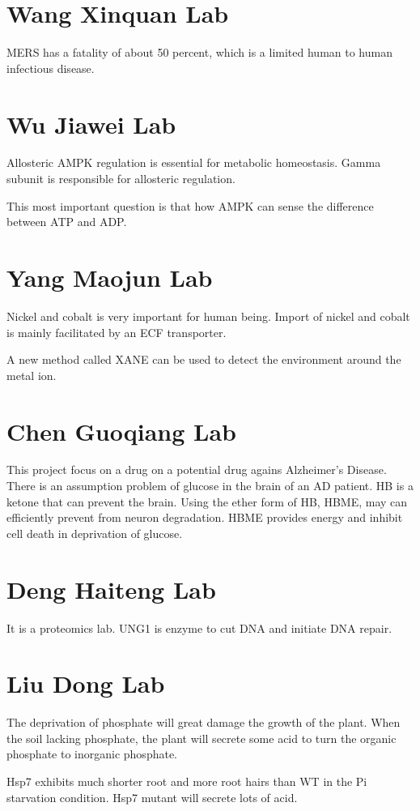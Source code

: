 \documentclass[11pt, oneside]{article}   	%
\begin{document}
\section{Wang Xinquan Lab}
	\par
	MERS has a fatality of about 50 percent, which is a limited human to human infectious disease.
	\par
\section{Wu Jiawei Lab}
	\par
	Allosteric AMPK regulation is essential for metabolic homeostasis. Gamma subunit is responsible for allosteric regulation. 
	\par
	This most important question is that how AMPK can sense the difference between ATP and ADP. 
	\par
\section{Yang Maojun Lab}
	\par
	Nickel and cobalt is very important for human being. Import of nickel and cobalt is mainly facilitated by an ECF transporter.
	\par
	A new method called XANE can be used to detect the environment around the metal ion.
	\par
\section{Chen Guoqiang Lab}
	\par
	This project focus on a drug on a potential drug agains Alzheimer's Disease. There is an assumption problem of glucose in the brain of an AD patient. HB is a ketone that can prevent the brain. Using the ether form of HB, HBME, may can efficiently prevent from neuron degradation. HBME provides energy and inhibit cell death in deprivation of glucose.
	\par
\section{Deng Haiteng Lab}
	\par
	It  is a proteomics lab. UNG1 is enzyme to cut DNA and initiate DNA repair.
	\par
\section{Liu Dong Lab}
	\par
	The deprivation of phosphate will great damage the growth of the plant. When the soil lacking phosphate, the plant will secrete some acid to turn the organic phosphate to inorganic phosphate.
	\par
	Hsp7 exhibits much shorter root and more root hairs than WT in the Pi starvation condition. Hsp7 mutant will secrete lots of acid.
	\par
\end{document}
